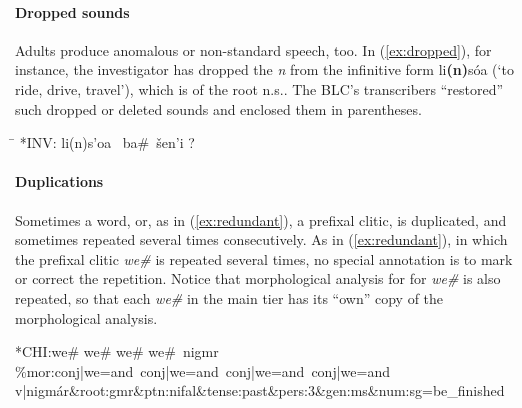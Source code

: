 \paragraph{Dropped sounds}
Adults produce anomalous or non-standard speech, too. In (\ref{ex:dropped}), for instance, the investigator 
has dropped the 
\emph{n} from the infinitive form 
\textsf{li\textbf{(n)}s\'oa} (`to ride, drive, travel'), 
which is of the root n.s.. 
The BLC's transcribers ``restored'' such dropped or deleted sounds and enclosed them in parentheses.
\begin{exe} \label{ex:dropped}
\ex \begin{tabbing}
\hspace{0.6in} \= \hspace{5.5in} \kill
\textsf{*INV:} \> \textsf{li(n)s\a'{o}a \, ba\#\, \v{s}en\a'{i} ?}
\end{tabbing}
\end{exe}

\paragraph{Duplications}
Sometimes a word, or, as in (\ref{ex:redundant}), a prefixal clitic, is duplicated, and sometimes repeated
several times consecutively. As in (\ref{ex:redundant}), in which the prefixal clitic \textit{we\#} is 
repeated several times, no special annotation is to mark or correct the repetition. Notice that morphological analysis for
for \textit{we\#} is also repeated, so that each \textit{we\#} in the main tier has its ``own'' copy of the morphological analysis.
\begin{exe} \label{ex:redundant}
\ex \textsf{*CHI:\quad we\# we\# we\# we\#\, nigmr } \\
   \textsf{\%mor:\quad conj|we=and\, conj|we=and\, conj|we=and\, conj|we=and} \\
   \textsf{v|nigm\'ar\&root:gmr\&ptn:nifal\&tense:past\&pers:3\&gen:ms\&num:sg=be\_finished }
\end{exe}

 
